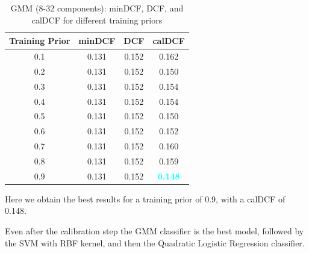 \documentclass[12pt]{report}
\newcommand{\nnl}{%
    \newline
    \newline
}
\begin{document}
\begin{table}[H]
    \centering
    \begin{tabular}{|c|c|c|c|}
        \hline
        \rowcolor{blue!10}
        \textbf{Training Prior} & \textbf{minDCF} & \textbf{DCF} & \textbf{calDCF}                  \\
        \hline
        0.1                     & 0.131           & 0.152        & 0.162                            \\
        \hline
        0.2                     & 0.131           & 0.152        & 0.150                            \\
        \hline
        0.3                     & 0.131           & 0.152        & 0.154                            \\
        \hline
        0.4                     & 0.131           & 0.152        & 0.154                            \\
        \hline
        0.5                     & 0.131           & 0.152        & 0.150                            \\
        \hline
        0.6                     & 0.131           & 0.152        & 0.152                            \\
        \hline
        0.7                     & 0.131           & 0.152        & 0.160                            \\
        \hline
        0.8                     & 0.131           & 0.152        & 0.159                            \\
        \hline
        0.9                     & 0.131           & 0.152        & \textcolor{cyan}{\textbf{0.148}} \\
        \hline
    \end{tabular}
    \caption{GMM (8-32 components): minDCF, DCF, and calDCF for different training priors}
    \label{tab:GMM_Priors}
\end{table}
\noindent
Here we obtain the best results for a training prior of 0.9, with a calDCF of 0.148.
\nnl
Even after the calibration step the GMM classifier is the best model, followed by the SVM with RBF kernel, and then the Quadratic Logistic Regression classifier.
\end{document}
